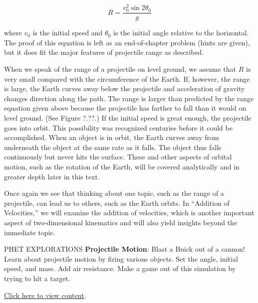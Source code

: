 \documentclass[main-ap-physics.tex]{subfiles}
\begin{document}
\begin{equation}
    R = \frac{v_0^2 \sin{2 \theta_0}}{g}
\end{equation}

where $v_0$ is the initial speed and $\theta_0$ is the initial angle relative to the horizontal. The proof of this equation is left as an end-of-chapter problem (hints are given), but it does fit the major features of projectile range as described.

\vspace{1em}

When we speak of the range of a projectile on level ground, we assume that $R$ is very small compared with the circumference of the Earth. If, however, the range is large, the Earth curves away below the projectile and acceleration of gravity changes direction along the path. The range is larger than predicted by the range equation given above because the projectile has farther to fall than it would on level ground. (See Figure ?.??.) If the initial speed is great enough, the projectile goes into orbit. This possibility was recognized centuries before it could be accomplished. When an object is in orbit, the Earth curves away from underneath the object at the same rate as it falls. The object thus falls continuously but never hits the surface. These and other aspects of orbital motion, such as the rotation of the Earth, will be covered analytically and in greater depth later in this text.

\vspace{1em}

Once again we see that thinking about one topic, such as the range of a projectile, can lead us to others, such as the Earth orbits. In ``Addition of Velocities,'' we will examine the addition of velocities, which is another important aspect of two-dimensional kinematics and will also yield insights beyond the immediate topic.

\begin{gradient}{PHET EXPLORATIONS}
    \textbf{Projectile Motion}: Blast a Buick out of a cannon! Learn about projectile motion by firing various objects. Set the angle, initial speed, and mass. Add air resistance. Make a game out of this simulation by trying to hit a target.   

    \vspace{1em}

    \href{https://phet.colorado.edu/sims/html/projectile-motion/latest/projectile-motion_all.html}{Click here to view content}.
\end{gradient}
\end{document}
